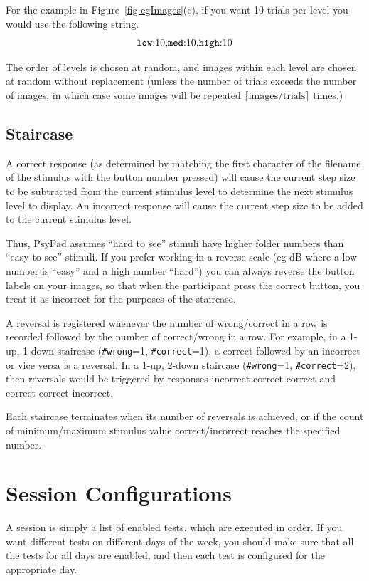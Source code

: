 \documentclass{article}
\begin{document}
For the example in Figure~\ref{fig-egImages}(c), if you want 10 trials per level you would use the
following string.
$$
\mbox{\tt low}{:}10{,}\mbox{\tt med}{:}10{,}\mbox{\tt high}{:}10
$$

The order of levels is chosen at random, and images within each level are chosen at random without
replacement (unless the number of trials exceeds the number of images, in which case some images will
be repeated $\lceil\mbox{images}/\mbox{trials}\rceil$ times.)

\subsection{Staircase}
\label{sec-staircase}

A correct response (as determined by matching the first character of the 
filename of the stimulus with the button number pressed) will cause the
current step size to be subtracted from the current stimulus level to
determine the next stimulus level to display.
An incorrect response 
will cause the
current step size to be added to the current stimulus level.

Thus, PsyPad assumes ``hard to see'' stimuli have higher folder numbers than ``easy to see'' 
stimuli.
If you prefer working in a reverse scale (eg dB where a low number is ``easy'' and a high number ``hard'')
you can always reverse the button labels on your images, so that
when the participant press the correct button, you treat it as incorrect for the purposes of the 
staircase.

A reversal is registered whenever the number of wrong/correct in
a row is recorded followed by the number of correct/wrong in a row.
For example, in a 1-up, 1-down staircase 
({\tt \#wrong}=1, {\tt \#correct}=1),
a correct followed by an incorrect or vice versa is a reversal.
In a 1-up, 2-down staircase
({\tt \#wrong}=1, {\tt \#correct}=2), then reversals would be triggered by
responses incorrect-correct-correct and correct-correct-incorrect.

Each staircase terminates when its number of reversals is achieved, or 
if the count of minimum/maximum stimulus value correct/incorrect reaches 
the specified number.

\section{Session Configurations}
\label{sec-configs}

A session is simply a list of enabled tests, which are executed in
order. If you want different tests on different days of the week,
you should make sure that all the tests for all days are enabled,
and then each test is configured for the appropriate day.
\end{document}
